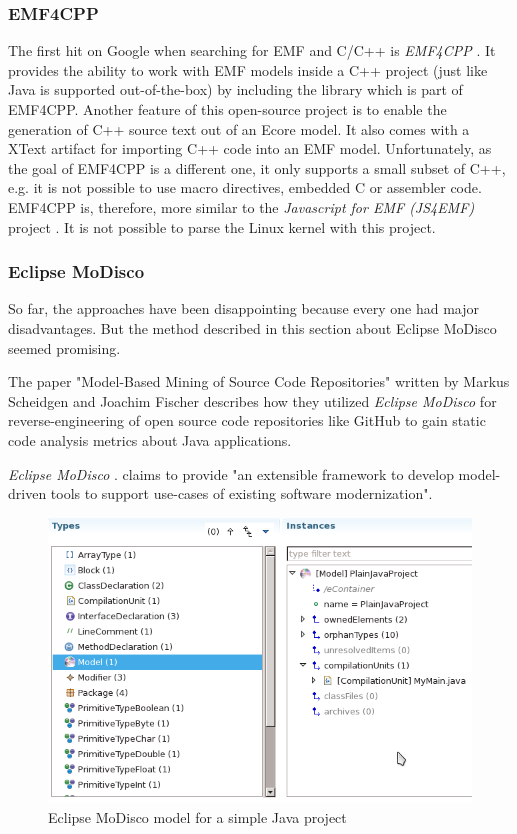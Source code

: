 \subsubsection{EMF4CPP}
The first hit on Google when searching for EMF and C/C++ is 
{\it EMF4CPP}
\cite{EMF4CPP} 
\cite{senac2010emf4cpp}. 
It provides the ability to work with EMF models inside a 
C++ project
(just like Java is supported out-of-the-box) by including the 
library which is part of EMF4CPP.
Another feature of this open-source project is to enable the 
generation of C++ source text out of an Ecore model.
It also comes with a XText artifact for importing C++ code 
into an EMF model.
Unfortunately, as the goal of EMF4CPP is a different one,
it only supports a small subset of C++, 
e.g. it is not possible to 
use macro directives, embedded C or assembler code.
EMF4CPP is, therefore, more similar to the 
{\it Javascript for EMF (JS4EMF)} project
\cite{JavaScript4EMF_1}
\cite{JavaScript4EMF_2}.
It is not possible 
to parse the Linux kernel with
this project.

\subsubsection{Eclipse MoDisco}
So far, the approaches have been disappointing because
every one had major disadvantages. But the method described
in this section about Eclipse MoDisco seemed promising.

The paper  "Model-Based Mining of Source Code Repositories"
\cite{scheidgen2014model}
written by
Markus Scheidgen and Joachim
Fischer describes how they utilized {\it Eclipse MoDisco}
for reverse-engineering of open source code repositories
like GitHub to gain static code analysis metrics about
Java applications. 

{\it Eclipse MoDisco} 
\cite{Modisco_1}
\cite{bruneliere2010modisco}
\cite{bruneliere2014modisco}.
claims to provide "an
extensible framework to develop model-driven tools to support
use-cases of existing software modernization". 

\begin{figure}[ht]
    \centering
	\includegraphics[scale=0.5]{images/JavaAST-2}
	\caption{Eclipse MoDisco model for a simple Java project}
    \label{fig:JavaAST2}
\end{figure}

